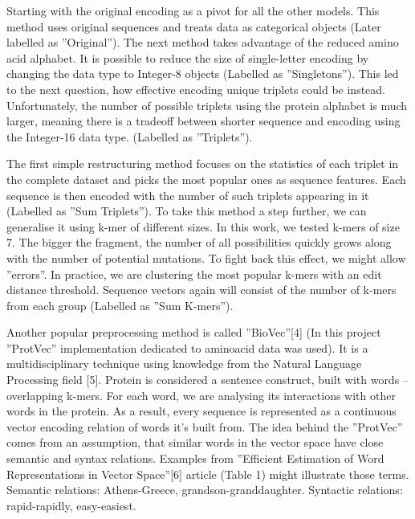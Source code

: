 \documentclass[12pt]{article}
\begin{document}
Starting with the original encoding as a pivot for all the other models. This method uses original sequences and treats data as categorical objects (Later labelled as ''Original'').
The next method takes advantage of the reduced amino acid alphabet. It is possible to reduce the size of single-letter encoding by changing the data type to Integer-8 objects (Labelled as ''Singletons'').
This led to the next question, how effective encoding unique triplets could be instead. Unfortunately, the number of possible triplets using the protein alphabet is much larger, meaning there is a tradeoff between shorter sequence and encoding using the Integer-16 data type. (Labelled as ''Triplets'').


The first simple restructuring method focuses on the statistics of each triplet in the complete dataset and picks the most popular ones as sequence features. Each sequence is then encoded with the number of such triplets appearing in it (Labelled as ''Sum Triplets'').
To take this method a step further, we can generalise it using k-mer of different sizes. In this work, we tested k-mers of size 7. The bigger the fragment, the number of all possibilities quickly grows along with the number of potential mutations. To fight back this effect, we might allow ''errors''. In practice, we are clustering the most popular k-mers with an edit distance threshold. Sequence vectors again will consist of the number of k-mers from each group (Labelled as ''Sum K-mers'').

Another popular preprocessing method is called ''BioVec''[4] (In this project ''ProtVec'' implementation dedicated to aminoacid data was used). It is a multidisciplinary technique using knowledge from the Natural Language Processing field [5]. Protein is considered a sentence construct, built with words -- overlapping k-mers. For each word, we are analysing its interactions with other words in the protein. As a result, every sequence is represented as a continuous vector encoding relation of words it's built from. The idea behind the ''ProtVec'' comes from an assumption, that similar words in the vector space have close semantic and syntax relations.
Examples from ''Efficient Estimation of Word Representations in Vector Space''[6] article (Table 1) might illustrate those terms. Semantic relations: Athens-Greece, grandson-granddaughter. Syntactic relations: rapid-rapidly, easy-easiest.
\end{document}
